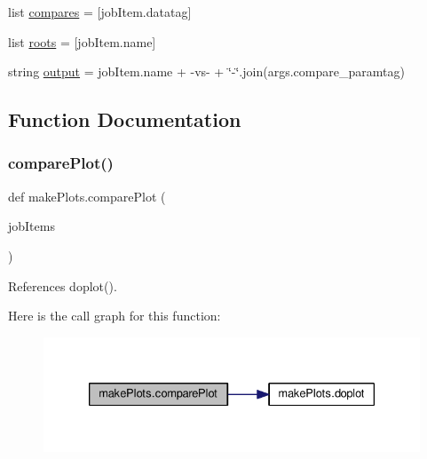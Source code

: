 \begin{DoxyCompactItemize}
\item 
list \mbox{\hyperlink{namespacemakePlots_ae8c0d6e7cc3a0a459ac3bce62ae24c15}{compares}} = \mbox{[}job\+Item.\+datatag\mbox{]}
\item 
list \mbox{\hyperlink{namespacemakePlots_aa535eb36e332d0cec6f90fa308a42c52}{roots}} = \mbox{[}job\+Item.\+name\mbox{]}
\item 
string \mbox{\hyperlink{namespacemakePlots_a3c9805983858c38e3997774e1573274a}{output}} = job\+Item.\+name + \textquotesingle{}-\/vs-\/\textquotesingle{} + \char`\"{}-\/\char`\"{}.join(args.\+compare\+\_\+paramtag)
\end{DoxyCompactItemize}


\subsection{Function Documentation}
\mbox{\label{namespacemakePlots_abb2409cda5200ce8d8bdd4ef76a8a2cd}} 
\subsubsection{\texorpdfstring{compare\+Plot()}{comparePlot()}}
{\footnotesize\ttfamily def make\+Plots.\+compare\+Plot (\begin{DoxyParamCaption}\item[{}]{job\+Items }\end{DoxyParamCaption})}



References doplot().

Here is the call graph for this function\+:
\nopagebreak
\begin{figure}[H]
\begin{center}
\leavevmode
\includegraphics[width=330pt]{namespacemakePlots_abb2409cda5200ce8d8bdd4ef76a8a2cd_cgraph}
\end{center}
\end{figure}
\mbox{\label{namespacemakePlots_a34cc3a765a66641e1e3c206e53215a8f}} 
